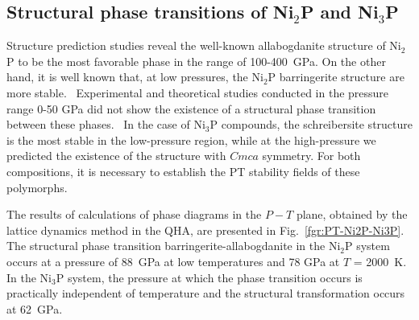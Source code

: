 \documentclass[twoside,twocolumn,9pt]{article}
\begin{document}
\subsection{Structural phase transitions of Ni$_2$P and Ni$_3$P} 

Structure prediction studies reveal the well-known allabogdanite structure of Ni$_2$P to be the most favorable phase in the range of 100-400~GPa. 
On the other hand, it is well known that, at low pressures, the Ni$_2$P barringerite structure are more stable.~\cite{Buseck1969}
Experimental and theoretical studies conducted in the pressure range 0-50 GPa did not show the existence of a structural phase transition between these phases.~\cite{Dera-2009-JGR,Nisar-2010-EPSL}
In the case of Ni$_3$P compounds, the schreibersite structure is the most stable in the low-pressure region,\cite{skala_m-2003} while at the high-pressure we predicted the existence of the structure with $Cmca$ symmetry. 
For both compositions, it is necessary to establish the PT stability fields of these polymorphs. 

The results of calculations of phase diagrams in the $P-T$ plane, obtained by the lattice dynamics method in the QHA, are presented in Fig.~\ref{fgr:PT-Ni2P-Ni3P}. 
The structural phase transition barringerite-allabogdanite in the Ni$_2$P system occurs at a pressure of 88~GPa at low temperatures and 78 GPa at $T$ = 2000~K. 
In the Ni$_3$P system, the pressure at which the phase transition occurs is practically independent of temperature and the structural transformation occurs at 62~GPa.
\end{document}
